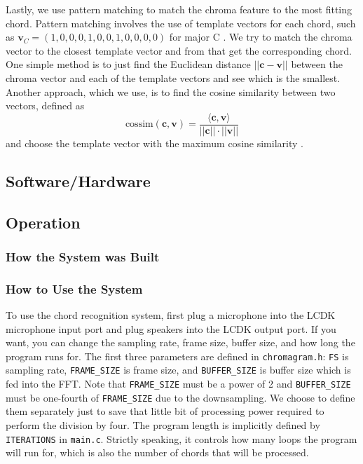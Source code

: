 \documentclass[journal]{IEEEtran}
\begin{document}
Lastly, we use pattern matching to match the chroma feature to the most fitting chord.
Pattern matching involves the use of template vectors for each chord, such as $\mathbf{v}_C = (1, 0, 0, 0, 1, 0, 0, 1, 0, 0, 0, 0)$ for major C \cite{jiang}.
We try to match the chroma vector to the closest template vector and from that get the corresponding chord.
One simple method is to just find the Euclidean distance $||\mathbf{c} - \mathbf{v}||$ between the chroma vector and each of the template vectors and see which is the smallest.
Another approach, which we use,  is to find the cosine similarity between two vectors, defined as 
\begin{equation}
    \text{cossim}(\mathbf{c}, \mathbf{v}) = \frac{\langle\mathbf{c}, \mathbf{v}\rangle}{||\mathbf{c}|| \cdot ||\mathbf{v}||}
    \label{eq:cossim}
\end{equation}
and choose the template vector with the maximum cosine similarity \cite{jiang}.

\subsection{Software/Hardware}

\subsection{Operation}

\subsubsection{How the System was Built}

\subsubsection{How to Use the System}
To use the chord recognition system, first plug a microphone into the LCDK microphone input port and plug speakers into the LCDK output port.
If you want, you can change the sampling rate, frame size, buffer size, and how long the program runs for.
The first three parameters are defined in \texttt{chromagram.h}: \texttt{FS} is sampling rate, \texttt{FRAME\_SIZE} is frame size, and \texttt{BUFFER\_SIZE} is buffer size which is fed into the FFT.
Note that \texttt{FRAME\_SIZE} must be a power of 2 and \texttt{BUFFER\_SIZE} must be one-fourth of \texttt{FRAME\_SIZE} due to the downsampling.
We choose to define them separately just to save that little bit of processing power required to perform the division by four.
The program length is implicitly defined by \texttt{ITERATIONS} in \texttt{main.c}.
Strictly speaking, it controls how many loops the program will run for, which is also the number of chords that will be processed.
\end{document}
